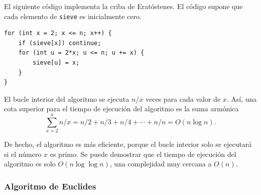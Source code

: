 \begin{center}
\end{center}

El siguiente código implementa la criba de
Eratóstenes.
El código supone que cada elemento de
\texttt{sieve} es inicialmente cero.

\begin{lstlisting}
for (int x = 2; x <= n; x++) {
    if (sieve[x]) continue;
    for (int u = 2*x; u <= n; u += x) {
        sieve[u] = x;
    }
}
\end{lstlisting}

El bucle interior del algoritmo se ejecuta
$n/x$ veces para cada valor de $x$.
Así, una cota superior para el tiempo de ejecución
del algoritmo es la suma armónica
\[\sum_{x=2}^n n/x = n/2 + n/3 + n/4 + \cdots + n/n = O(n \log n).\]


De hecho, el algoritmo es más eficiente,
porque el bucle interior solo se ejecutará si
el número $x$ es primo.
Se puede demostrar que el tiempo de ejecución del
algoritmo es solo $O(n \log \log n)$,
una complejidad muy cercana a $O(n)$.

\subsubsection{Algoritmo de Euclides}

